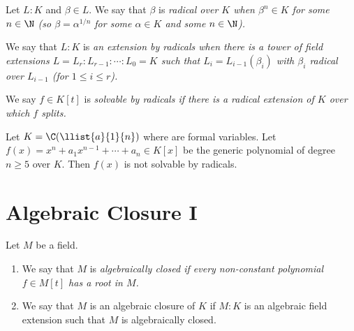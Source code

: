 \documentclass{article}
\begin{document}

\begin{tdefinition}[Radical]
  Let \( L:K \) and \( \beta \in L \).
  We say that \( \beta \) is \it{radical} over \( K \) when \( \beta^n \in K \) for some \( n \in \N \) (so \( \beta = \alpha^{1/n} \) for some \( \alpha \in K \) and some \( n \in \N \)).
\end{tdefinition}

\begin{tdefinition}
    We say that \( L:K \) is \it{an extension by radicals} when there is a tower of field extensions \( L = L_r : L_{r-1} : \cdots : L_0 = K \) such that \( L_i = L_{i-1}(\beta_i) \) with \( \beta_i \) radical over \( L_{i-1} \) (for \( 1 \leq i \leq r \)).
\end{tdefinition}

\begin{tdefinition}
    We say \( f \in K[t] \) is \it{solvable by radicals} if there is a radical extension of \( K \) over which \( f \) splits.
\end{tdefinition}

\begin{ttheorem}
  Let \( K=\C(\llist{a}{1}{n}) \) where  are formal variables.
  Let \( f(x) = x^n+a_1x^{n-1}+\cdots+a_n \in K[x] \) be the generic polynomial of degree \( n\geq 5 \) over \( K \).
  Then \( f(x) \) is not solvable by radicals.
\end{ttheorem}

\section{Algebraic Closure I}
\begin{tdefinition}
  Let \( M \) be a field. \begin{enumerate}[label=(\roman*)]
    \item We say that \( M \) is \it{algebraically closed} if every non-constant polynomial \( f\in M[t] \) has a root in \( M \).
    \item We say that \( M \) is an algebraic closure of \( K \) if \( M:K \) is an algebraic field extension such that \( M \) is algebraically closed.
  \end{enumerate}
\end{tdefinition}
\end{document}
